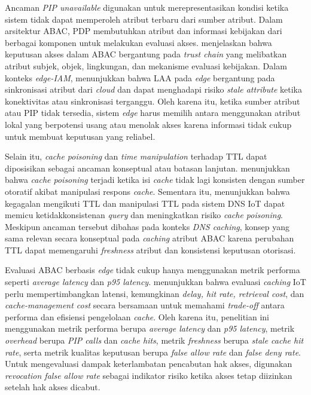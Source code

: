 Ancaman \textit{PIP unavailable} digunakan untuk merepresentasikan kondisi ketika sistem tidak dapat memperoleh atribut terbaru dari sumber atribut. Dalam arsitektur ABAC, PDP membutuhkan atribut dan informasi kebijakan dari berbagai komponen untuk melakukan evaluasi akses. \textcite{tall_framework_2023} menjelaskan bahwa keputusan akses dalam ABAC bergantung pada \textit{trust chain} yang melibatkan atribut subjek, objek, lingkungan, dan mekanisme evaluasi kebijakan. Dalam konteks \textit{edge-IAM}, \textcite{wang_edge-enabled_2025} menunjukkan bahwa LAA pada \textit{edge} bergantung pada sinkronisasi atribut dari \textit{cloud} dan dapat menghadapi risiko \textit{stale attribute} ketika konektivitas atau sinkronisasi terganggu. Oleh karena itu, ketika sumber atribut atau PIP tidak tersedia, sistem \textit{edge} harus memilih antara menggunakan atribut lokal yang berpotensi usang atau menolak akses karena informasi tidak cukup untuk membuat keputusan yang reliabel.

Selain itu, \textit{cache poisoning} dan \textit{time manipulation} terhadap TTL dapat diposisikan sebagai ancaman konseptual atau batasan lanjutan. \textcite{yu_dns-sensor_2025} menunjukkan bahwa \textit{cache poisoning} terjadi ketika isi \textit{cache} tidak lagi konsisten dengan sumber otoratif akibat manipulasi respons \textit{cache}. Sementara itu, \textcite{losty_towards_2025} menunjukkan bahwa kegagalan mengikuti TTL dan manipulasi TTL pada sistem DNS IoT dapat memicu ketidakkonsistenan \textit{query} dan meningkatkan risiko \textit{cache poisoning}. Meskipun ancaman tersebut dibahas pada konteks \textit{DNS caching}, konsep yang sama relevan secara konseptual pada \textit{caching} atribut ABAC karena perubahan TTL dapat memengaruhi \textit{freshness} atribut dan konsistensi keputusan otorisasi.

Evaluasi ABAC berbasis \textit{edge} tidak cukup hanya menggunakan metrik performa seperti \textit{average latency} dan \textit{p95 latency}. \textcite{weerasinghe_adaptive_2023} menunjukkan bahwa evaluasi \textit{caching} IoT perlu mempertimbangkan latensi, kemungkinan \textit{delay, hit rate, retrieval cost}, dan \textit{cache-management cost} secara bersamaan untuk memahami \textit{trade-off} antara performa dan efisiensi pengelolaan \textit{cache}. Oleh karena itu, penelitian ini menggunakan metrik performa berupa \textit{average latency} dan \textit{p95 latency}, metrik \textit{overhead} berupa \textit{PIP calls} dan \textit{cache hits}, metrik \textit{freshness} berupa \textit{stale cache hit rate}, serta metrik kualitas keputusan berupa \textit{false allow rate} dan \textit{false deny rate}. Untuk mengevaluasi dampak keterlambatan pencabutan hak akses, digunakan \textit{revocation false allow rate} sebagai indikator risiko ketika akses tetap diizinkan setelah hak akses dicabut.

